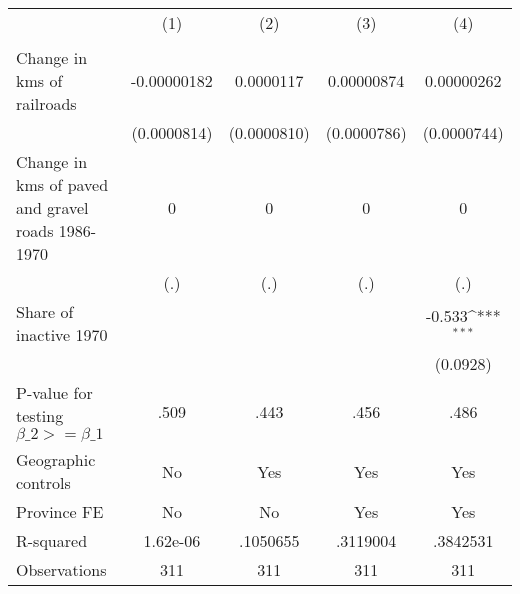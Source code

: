 \begin{table}[htbp]\centering
\def\sym#1{\ifmmode^{#1}\else\(^{#1}\)\fi}
\caption{}
\begin{tabular}{l*{4}{c}}
\hline\hline
                &\multicolumn{1}{c}{(1)}&\multicolumn{1}{c}{(2)}&\multicolumn{1}{c}{(3)}&\multicolumn{1}{c}{(4)}\\
                &\multicolumn{1}{c}{}&\multicolumn{1}{c}{}&\multicolumn{1}{c}{}&\multicolumn{1}{c}{}\\
\hline
Change in kms of railroads&-0.00000182         &0.0000117         &0.00000874         &0.00000262         \\
                &(0.0000814)         &(0.0000810)         &(0.0000786)         &(0.0000744)         \\
[1em]
Change in kms of paved and gravel roads 1986-1970&        0         &        0         &        0         &        0         \\
                &      (.)         &      (.)         &      (.)         &      (.)         \\
[1em]
Share of inactive 1970&                  &                  &                  &   -0.533\sym{***}\\
                &                  &                  &                  & (0.0928)         \\
\hline
P-value for testing $\beta\_{2} >= \beta\_{1}$&     .509         &     .443         &     .456         &     .486         \\
Geographic controls&       No         &      Yes         &      Yes         &      Yes         \\
Province FE     &       No         &       No         &      Yes         &      Yes         \\
R-squared       & 1.62e-06         & .1050655         & .3119004         & .3842531         \\
Observations    &      311         &      311         &      311         &      311         \\
\hline\hline
\end{tabular}
\end{table}
